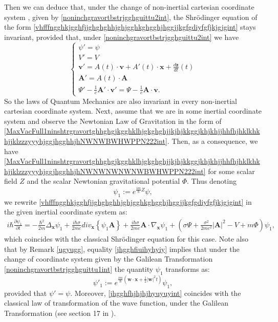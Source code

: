 \documentclass{article}
\theoremstyle{definition}
\theoremstyle{remark}
\renewcommand{\vec}[1]{\mathbf{#1}}
\newcommand{\er}{\eqref}
\newcommand{\er}{\eqref}
\begin{document}
Then we can deduce that, under the change of non-inertial cartesian
coordinate system , given by \er{noninchgravortbstrjgghguittu2int},
the Shr\"{o}dinger equation of the form
\er{vhfffngghkjgghfjjghghghhjghjgghkghgghjhggjjkgfgdiyfgfjkjgjgint}
stays invariant, provided that, under
\er{noninchgravortbstrjgghguittu2int} we have
\begin{equation}\label{vyfgjhgjhvhgghint}
\begin{cases}
\psi'=\psi
\\
V'=V
\\
\vec v'=A(t)\cdot \vec v+A'(t)\cdot\vec x+\frac{d\vec z}{dt}(t)\\
\vec A'=A(t)\cdot\vec A\\
\Psi'-\frac{1}{c}\vec A'\cdot\vec v'=\Psi-\frac{1}{c}\vec A\cdot\vec
v .
\end{cases}
\end{equation}
So the laws of Quantum Mechanics are also invariant in every
non-inertial cartesian coordinate system. Next, assume that we are
in some inertial coordinate system and observe the Newtonian Law of
Gravitation in the form of
\er{MaxVacFull1ninshtrgravortghhghgjkgghklhjgkghghjjkjhjkkggjkhjkhjjhhfhjhklkhkhjjklzzzyyyhjggjhgghhjhNWNWBWHWPPN222int}.
Then, as a consequence, we have
\er{MaxVacFull1ninshtrgravortghhghgjkgghklhjgkghghjjkjhjkkggjkhjkhjjhhfhjhklkhkhjjklzzzyyyhjggjhgghhjhNWNWNWNWNWBWHWPPN222int}
for some scalar field $Z$ and the scalar Newtonian gravitational
potential $\Phi$. Thus denoting
\begin{equation}\label{jhgghfiuihyhyiy}
\psi_1:=e^{\frac{im}{\hbar}Z}\psi,
\end{equation}
we rewrite
\er{vhfffngghkjgghfjjghghghhjghjgghkghgghjhggjjkgfgdiyfgfjkjgjgint}
in the given inertial coordinate system as:
\begin{multline*}
i\hbar\frac{\partial\psi_1}{\partial
t}=-\frac{\hbar^2}{2m}\Delta_{\vec x}\psi_1+\frac{
i\hbar\sigma}{2mc}div_{\vec x}\left\{\psi_1\vec A\right\}
+\frac{ i\hbar\sigma}{2mc}\vec A\cdot\nabla_{\vec x}\psi_1
+\left(\sigma\Psi+\frac{\sigma^2}{2mc^2}\left|\vec
A\right|^2-V+m\Phi\right)\psi_1,
\end{multline*}
which coincides with the classical Shr\"{o}dinger equation for this
case. Note also that by Remark \ref{ugyugg}, equality
\er{jhgghfiuihyhyiy} implies that under the change of coordinate
system given by the Galilean Transformation
\er{noninchgravortbstrjgghguittu1int} the quantity $\psi_1$
transforms as:
\begin{equation}\label{jhgghfhjhjhjhyuyuyint}
\psi'_1:=e^{\frac{im}{\hbar}(\vec w\cdot\vec x+\frac{1}{2}|\vec
w|^2t)}\psi_1,
\end{equation}
provided that $\psi'=\psi$. Moreover, \er{jhgghfhjhjhjhyuyuyint}
coincides with the classical law of transformation of the wave
function, under the Galilean Transformation (see section 17 in
\cite{LL}).
\end{document}
